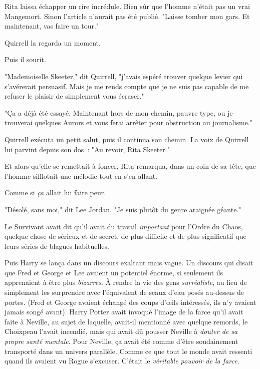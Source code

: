 Rita laissa échapper un rire incrédule. Bien sûr que l'homme n'était pas un vrai Mangemort. Sinon l'article n'aurait pas été publié. "Laisse tomber mon gars. Et maintenant, vas faire un tour."

Quirrell la regarda un moment.

Puis il sourit.

"Mademoiselle Skeeter," dit Quirrell, "j'avais espéré trouver quelque levier qui s'avérerait persuasif. Mais je me rends compte que je ne suis pas capable de me refuser le plaisir de simplement vous écraser."

"Ça a déjà été essayé. Maintenant hors de mon chemin, pauvre type, ou je trouverai quelques Aurors et vous ferai arrêter pour obstruction au journalisme."

Quirrell exécuta un petit salut, puis il continua son chemin. La voix de Quirrell lui parvint depuis son dos~: "Au revoir, Rita Skeeter."

Et alors qu'elle se remettait à foncer, Rita remarqua, dans un coin de sa tête, que l'homme sifflotait une mélodie tout en s'en allant.

Comme si \emph{ça} allait lui faire peur.


"Désolé, sans moi," dit Lee Jordan. "Je suis plutôt du genre araignée géante."

Le Survivant avait dit qu'il avait du travail \emph{important} pour l'Ordre du Chaos, quelque chose de sérieux et de secret, de plus difficile et de plus significatif que leurs séries de blagues habituelles.

Puis Harry se lança dans un discours exaltant mais vague. Un discours qui disait que Fred et George et Lee avaient un potentiel énorme, si seulement ils apprenaient à être plus \emph{bizarres}. À rendre la vie des gens \emph{surréaliste}, au lieu de simplement les surprendre avec l'équivalent de seaux d'eau posés au-dessus de portes. (Fred et George avaient échangé des coups d'œils intéressés, ils n'y avaient jamais songé avant). Harry Potter avait invoqué l'image de la farce qu'il avait faite à Neville, au sujet de laquelle, avait-il mentionné avec quelque remords, le Choixpeau l'avait incendié, mais qui avait dû pousser Neville à \emph{douter de sa propre santé mentale}. Pour Neville, ça avait été comme d'être soudainement transporté dans un univers parallèle. Comme ce que tout le monde avait ressenti quand ils avaient vu Rogue s'excuser. C'était le \emph{véritable pouvoir de la farce}.

